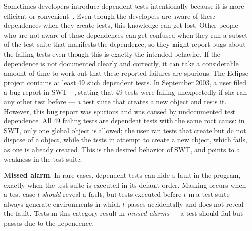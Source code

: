 Sometimes developers introduce dependent tests intentionally because it is
more efficient or convenient~\cite{kapfhammeretal:FSE:2003, whittakeretal:2012}.
Even though the developers are aware of these dependences
when they create tests, this knowledge can get lost.
Other people who are not aware of these dependences can get confused 
when they run a subset of the test suite that manifests the
dependence, so they might report bugs about the failing tests
even though this is exactly the intended behavior. 
If the dependence is not documented clearly and
correctly, it can take a considerable amount of time to work out that
these reported failures are spurious. 
The Eclipse project contains at least
49 such dependent tests.
In September 2003, a user filed a
bug report in SWT~\cite{swt}~\cite{eclipsebug},
stating that 49 tests were failing unexpectedly
if she ran any other test before  --- 
a test suite that creates a new  object and tests it.
However, this bug report was spurious and was
caused by undocumented test dependence.
All 49 failing tests are dependent tests with the same
root cause: in SWT, only one global 
object is allowed; the user ran tests that
create but do not dispose of a  object, while
the tests in  attempt to create
a new  object, which fails, as one
is already created. This is the desired behavior of SWT,
and points to a weakness in the test suite.

\tinyrelax
\noindent \textbf{Missed alarm}. In rare cases,
dependent tests can hide a fault in the
program, {exactly} when the test suite is executed in its default
order. Masking occurs when a test case $t$ \emph{should}
reveal a fault, but tests executed before $t$ in a test suite always
generate environments in which $t$ passes accidentally and
does not reveal the fault. 
Tests in this category result in \textit{missed alarms} ---
a test should fail but passes due to the dependence.



